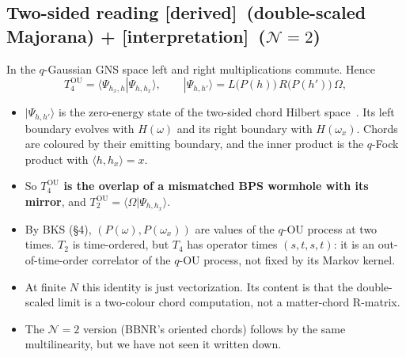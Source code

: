 \documentclass[11pt]{article}
\newcommand{\OU}{\mathrm{OU}}
\newcommand{\tagbox}[2]{\textsf{\small\color{#1}[#2]}}
\newcommand{\DER}{\tagbox{cder}{derived}}
\newcommand{\INTERP}{\tagbox{cconj}{interpretation}}
\theoremstyle{remark}
\begin{document}
\subsection{Two-sided reading \DER\ (double-scaled Majorana) + \INTERP\ ($\mathcal N=2$)}
In the $q$-Gaussian GNS space left and right multiplications commute. Hence
\begin{equation}
T_4^\OU=\langle\Psi_{h_x,h}|\Psi_{h,h_x}\rangle,\qquad |\Psi_{h,h'}\rangle=L\big(P(h)\big)\,R\big(P(h')\big)\,\Omega ,
\end{equation}
\begin{itemize}\itemsep1pt
\item $|\Psi_{h,h'}\rangle$ is the zero-energy state of the two-sided chord Hilbert space~\cite{Lin22}. Its left
  boundary evolves with $H(\omega)$ and its right boundary with $H(\omega_x)$. Chords are coloured by their emitting
  boundary, and the inner product is the $q$-Fock product with $\langle h,h_x\rangle=x$.
\item So \textbf{$T_4^\OU$ is the overlap of a mismatched BPS wormhole with its mirror}, and
  $T_2^\OU=\langle\Omega|\Psi_{h,h_x}\rangle$.
\item By BKS (\S4), $(P(\omega),P(\omega_x))$ are values of the $q$-OU process at two times. $T_2$ is time-ordered, but
  $T_4$ has operator times $(s,t,s,t)$: it is an out-of-time-order correlator of the $q$-OU process, not fixed by its
  Markov kernel.
\item At finite $N$ this identity is just vectorization. Its content is that the double-scaled limit is a two-colour
  chord computation, not a matter-chord R-matrix.
\item The $\mathcal N=2$ version (BBNR's oriented chords) follows by the same multilinearity, but we have not seen it
  written down.
\end{itemize}

\FloatBarrier
\end{document}
